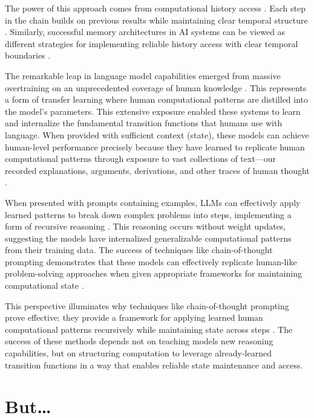 \documentclass[12pt]{article}
\begin{document}
The power of this approach comes from computational history access \cite{fu2024memory}.
Each step in the chain builds on previous results while maintaining clear temporal structure \cite{wei2022chain}.
Similarly, successful memory architectures in AI systems can be viewed as different strategies for implementing reliable history access with clear temporal boundaries \cite{yang2013survey}.

The remarkable leap in language model capabilities emerged from massive overtraining on an unprecedented coverage of human knowledge \cite{schuurmans2024autoregressive}.
This represents a form of transfer learning where human computational patterns are distilled into the model's parameters.
This extensive exposure enabled these systems to learn and internalize the fundamental transition functions that humans use with language.
When provided with sufficient context (state), these models can achieve human-level performance precisely because they have learned to replicate human computational patterns through exposure to vast collections of text---our recorded explanations, arguments, derivations, and other traces of human thought \cite{brown2020language,wei2022chain}.

When presented with prompts containing examples, LLMs can effectively apply learned patterns to break down complex problems into steps, implementing a form of recursive reasoning \cite{wei2022chain}.
This reasoning occurs without weight updates, suggesting the models have internalized generalizable computational patterns from their training data.
The success of techniques like chain-of-thought prompting demonstrates that these models can effectively replicate human-like problem-solving approaches when given appropriate frameworks for maintaining computational state \cite{wei2022emergent}.

This perspective illuminates why techniques like chain-of-thought prompting prove effective: they provide a framework for applying learned human computational patterns recursively while maintaining state across steps \cite{wei2022chain}.
The success of these methods depends not on teaching models new reasoning capabilities, but on structuring computation to leverage already-learned transition functions in a way that enables reliable state maintenance and access.

\section{But\ldots}
\end{document}
